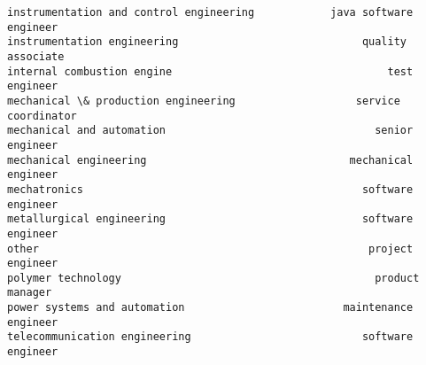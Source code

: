 \documentclass[11pt]{article}
\begin{document}
\begin{tcolorbox}[breakable, size=fbox, boxrule=.5pt, pad at break*=1mm, opacityfill=0]
\begin{Verbatim}[commandchars=\\\{\}]
instrumentation and control engineering            java software engineer
instrumentation engineering                             quality associate
internal combustion engine                                  test engineer
mechanical \& production engineering                   service coordinator
mechanical and automation                                 senior engineer
mechanical engineering                                mechanical engineer
mechatronics                                            software engineer
metallurgical engineering                               software engineer
other                                                    project engineer
polymer technology                                        product manager
power systems and automation                         maintenance engineer
telecommunication engineering                           software engineer


\end{Verbatim}
\end{tcolorbox}
\end{document}
